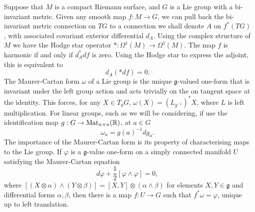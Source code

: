 Suppose that $M$ is a compact Riemann surface, and $G$ is a Lie group with a bi-invariant metric. Given any smooth map $f: M\to G$, we can pull back the bi-invariant metric connection on $TG$ to a connection we shall denote $A$ on $f^*(TG)$, with associated covariant exterior differential $d_A$. Using the complex structure of $M$ we have the Hodge star operator $* : Ω^1(M) \to Ω^1(M)$. The map $f$ is harmonic if and only if $d_A^* df$ is zero. Using the Hodge star to express the adjoint, this is equivalent to
\[
d_A (* df) = 0.
\]
The Maurer-Cartan form $ω$ of a Lie group is the unique $\mathfrak{g}$-valued one-form that is invariant under the left group action and acts trivially on the on tangent space at the identity. This forces, for any $X\in T_gG$, $ω(X) = (L_{g^{-1}})^* X$, where $L$ is left multiplication. For linear groups, such as we will be considering, if use the identification map $g:G \to \Mat_{n\times n}(\R)$, at $a\in G$
\[
ω_a = g(a)^{-1} dg_a.
\]
The importance of the Maurer-Cartan form is its property of characterising maps to the Lie group. If $φ$ is a $\mathfrak{g}$-value one-form on a simply connected manifold $U$ satisfying the Maurer-Cartan equation
\[
dφ + \frac{1}{2}[φ\wedge φ] = 0,
\]
where $[(X\otimes α) \wedge (Y\otimes β)] = [X,Y]\otimes(α\wedge β)$ for elements $X,Y\in\mathfrak{g}$ and differential forms $α,β$, then there is a map $f:U \to G$ such that $f^*ω = φ$, unique up to left translation.

